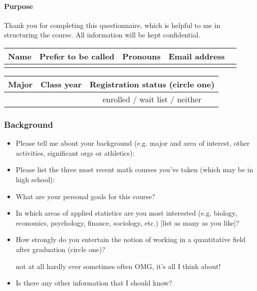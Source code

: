 \documentclass[10pt]{article}
\begin{document}

\paragraph*{Purpose} 
Thank you for completing this questionnaire, which is helpful to me in structuring the course.  All information will be kept confidential.

\begin{center}
\begin{tabular}{|c|c|c|c|c|}
	\hline
	Name & Prefer to be called & Pronouns & Email address \\
	\hline
	\hspace{1.5in} & \hspace{1in} & \hspace{0.5in} & \hspace{2.15in} \\[2ex]
	\hline
\end{tabular}
\newline
\vspace*{0.1in}
\newline
\begin{tabular}{|c|c|c|}
	\hline
	Major & Class year & Registration status (circle one) \\
	\hline
	\hspace{3in} & \hspace{0.5in} & enrolled / wait list / neither \\ [2ex]
	\hline
\end{tabular}
\end{center}

\subsubsection*{Background}
\begin{itemize}
  \itemsep0.7in
	\item Please tell me about your background (e.g. major and area of interest, other activities, significant orgs or athletics):
	\item Please list the three most recent math courses you've taken (which may be in high school):
	\item What are your personal goals for this course?
	\item In which areas of applied statistics are you most interested (e.g. biology, economics, psychology, finance, sociology, etc.) [list as many as you like]?
	\item How strongly do you entertain the notion of working in a quantitative field after graduation (circle one)?
	\begin{center}
		not at all \qquad hardly ever \qquad sometimes \qquad often \qquad OMG, it's all I think about!
	\end{center}
  \vspace{-0.7in}
	\item Is there any other information that I should know?
\end{itemize}
\end{document}
